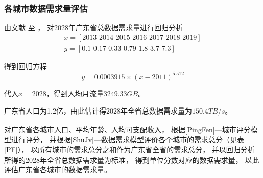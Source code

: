 \documentclass[UTF8,12pt]{ctexart}
\newcommand{\upcite}[1]{\textsuperscript{\cite{#1}}}
\begin{document}
\subsubsection[网络需求评估]{各城市数据需求量评估}\label{WLXQPG}
由文献\cite{yjJJ} 至 \cite{ysJJ}，
对2028年广东省总数据需求量进行回归分析
\begin{gather*}
    x=[2013\,\, 2014\,\, 2015\,\, 2016\,\, 2017\,\, 2018\,\, 2019]\\
    y=[0.1\,\, 0.17\,\, 0.33\,\, 0.79\,\, 1.8\,\, 3.7\,\, 7.3]
\end{gather*}\par
得到回归方程$$y=0.0003915×(x-2011)^{5.512}$$\par
代入$x=2028$，得到人均月流量$3249.33GB$。\par
广东省人口为1.2亿，由此估计得2028年全省总数据需求量为$150.4TB/s$。\par
对广东省各城市人口、平均年龄、人均可支配收入\upcite{CSSJ}，
根据\ref{PingFen}—城市评分模型进行评分，
并根据\ref{ShuJv}—数据需求模型评价各个城市的需求总分（见表\ref{PF}），
以所有城市的需求总分之和作为广东省全省的需求总分，
并以回归分析所得的2028年全省总数据需求量为标准，
得到单位分数对应的数据需求量，
以此评估广东省各城市的数据需求量。
\end{document}
